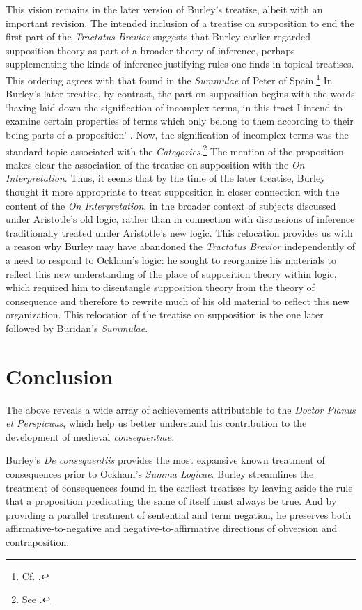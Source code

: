 \documentclass[]{birkjour}
\begin{document}
This vision remains in the later version of Burley's treatise, albeit with an important revision. The intended inclusion of a treatise on supposition to end the first part of the \textit{Tractatus Brevior} suggests that Burley earlier regarded supposition theory as part of a broader theory of inference, perhaps supplementing the kinds of inference-justifying rules one finds in topical treatises. This ordering agrees with that found in the \textit{Summulae} of Peter of Spain.\footnote{Cf. \autocite{Klima2003a}.} In Burley's later treatise, by contrast, the part on supposition begins with the words `having laid down the signification of incomplex terms, in this tract I intend to examine certain properties of terms which only belong to them according to their being parts of a proposition' \autocite[p. 1.3-6]{BurleyDPAL}. Now, the signification of incomplex terms was the standard topic associated with the \textit{Categories}.\footnote{See \autocite[p. 65]{Burley2003}.} The mention of the proposition makes clear the association of the treatise on supposition with the \textit{On Interpretation}. Thus, it seems that by the time of the later treatise, Burley thought it more appropriate to treat supposition in closer connection with the content of the \textit{On Interpretation}, in the broader context of subjects discussed under Aristotle's old logic, rather than in connection with discussions of inference traditionally treated under Aristotle's new logic. This relocation provides us with a reason why Burley may have abandoned the \textit{Tractatus Brevior} independently of a need to respond to Ockham's logic: he sought to reorganize his materials to reflect this new understanding of the place of supposition theory within logic, which required him to disentangle supposition theory from the theory of consequence and therefore to rewrite much of his old material to reflect this new organization. This relocation of the treatise on supposition is the one later followed by Buridan's \textit{Summulae}.

\section{Conclusion}
The above reveals a wide array of achievements attributable to the \textit{Doctor Planus et Perspicuus}, which help us better understand his contribution to the development of medieval \textit{consequentiae}.
	
Burley's \textit{De consequentiis} provides the most expansive known treatment of consequences prior to Ockham's \textit{Summa Logicae}. Burley streamlines the treatment of consequences found in the earliest treatises by leaving aside the rule that a proposition predicating the same of itself must always be true. And by providing a parallel treatment of sentential and term negation, he preserves both affirmative-to-negative and negative-to-affirmative directions of obversion and contraposition.
	
\end{document}
